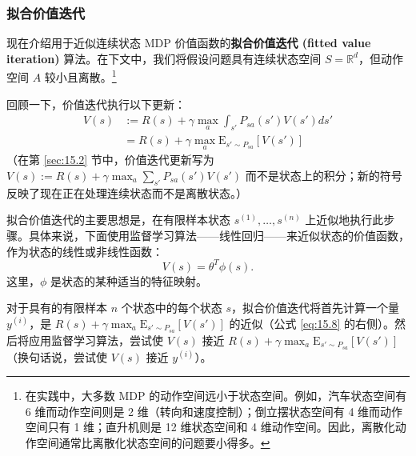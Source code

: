 \subsubsection*{拟合价值迭代}

现在介绍用于近似连续状态 MDP 价值函数的\textbf{拟合价值迭代 (fitted value iteration)} 算法。在下文中，我们将假设问题具有连续状态空间 $S = \mathbb{R}^d$，但动作空间 $A$ 较小且离散。\footnote{在实践中，大多数 MDP 的动作空间远小于状态空间。例如，汽车状态空间有 6 维而动作空间则是 2 维（转向和速度控制）；倒立摆状态空间有 4 维而动作空间只有 1 维；直升机则是 12 维状态空间和 4 维动作空间。因此，离散化动作空间通常比离散化状态空间的问题要小得多。}

回顾一下，价值迭代执行以下更新：
\begin{align}
    V(s) &:= R(s) + \gamma \max_a \int_{s'} P_{sa}(s')V(s')ds' \label{eq:15.7} \\
    &= R(s) + \gamma \max_a \mathrm{E}_{s' \sim P_{sa}} [V(s')] \label{eq:15.8}
\end{align}
（在第 \ref{sec:15.2} 节中，价值迭代更新写为 $V(s) := R(s) + \gamma \max_a \sum_{s'} P_{sa}(s')V(s')$ 而不是状态上的积分；新的符号反映了现在正在处理连续状态而不是离散状态。）

拟合价值迭代的主要思想是，在有限样本状态 $s^{(1)}, \dots, s^{(n)}$ 上近似地执行此步骤。具体来说，下面使用监督学习算法——线性回归——来近似状态的价值函数，作为状态的线性或非线性函数：
\[
    V(s) = \theta^T \phi(s).
\]
这里，$\phi$ 是状态的某种适当的特征映射。

对于具有的有限样本 $n$ 个状态中的每个状态 $s$，拟合价值迭代将首先计算一个量 $y^{(i)}$，是 $R(s) + \gamma \max_a \mathrm{E}_{s' \sim P_{sa}} [V(s')]$ 的近似（公式 \eqref{eq:15.8} 的右侧）。然后将应用监督学习算法，尝试使 $V(s)$ 接近 $R(s) + \gamma \max_a \mathrm{E}_{s' \sim P_{sa}} [V(s')]$（换句话说，尝试使 $V(s)$ 接近 $y^{(i)}$）。


